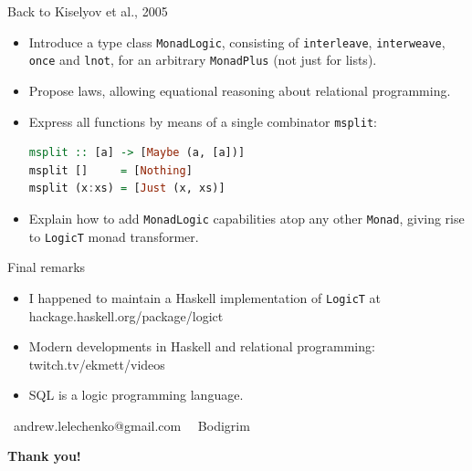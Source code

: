 \documentclass[handout]{beamer}
\begin{document}
\begin{frame}[fragile]{Back to Kiselyov et al., 2005}

\begin{itemize}[<+->]
\item Introduce a type class {\tt MonadLogic}, consisting of
      {\tt interleave}, {\tt interweave}, {\tt once} and {\tt lnot},
      for an arbitrary {\tt MonadPlus} (not just for lists).
\item Propose laws, allowing equational reasoning
      about relational programming.
\item Express all functions by means of a single combinator {\tt msplit}:
\begin{lstlisting}[language=Haskell]
msplit :: [a] -> [Maybe (a, [a])]
msplit []     = [Nothing]
msplit (x:xs) = [Just (x, xs)]
\end{lstlisting}

\item Explain how to add {\tt MonadLogic} capabilities atop any other {\tt Monad},
      giving rise to {\tt LogicT} monad transformer.

\end{itemize}

\end{frame}

\begin{frame}{Final remarks}

\begin{itemize}[<+->]
\item I happened to maintain a Haskell implementation of {\tt LogicT}
      at hackage.haskell.org/package/logict
\item Modern developments in Haskell and relational programming:
      twitch.tv/ekmett/videos
\item SQL is a logic programming language.
\end{itemize}

\bigskip
\bigskip
\bigskip

\par \faAt\ andrew.lelechenko@gmail.com
\hspace{7.5em}
\faGithub\ \faTelegram\ Bodigrim

\bigskip
\bigskip
\bigskip

\centerline{\Huge\bf Thank you!}
\end{frame}
\end{document}
